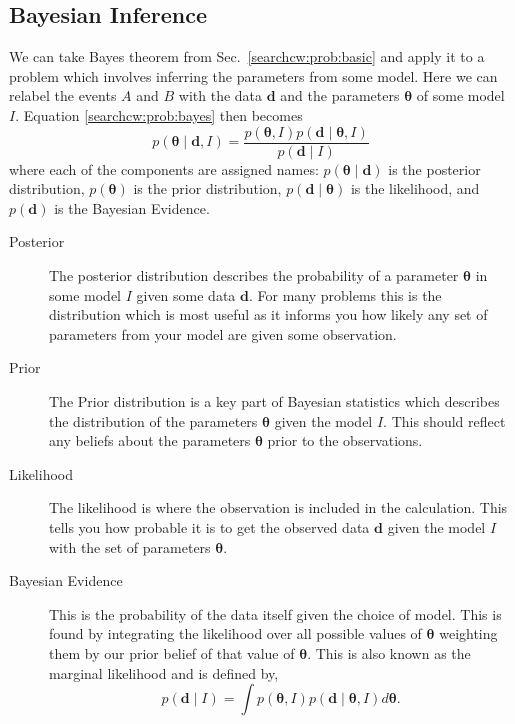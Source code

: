 \subsection{\label{searchcw:bayes}Bayesian Inference}

We can take Bayes theorem from Sec.~\ref{searchcw:prob:basic} and apply it to a
problem which involves inferring the parameters from some model. Here we can
relabel the events $A$ and $B$ with the data ${\bm d}$ and the parameters ${\bm
\theta}$ of some model $I$.  Equation \ref{searchcw:prob:bayes} then becomes
%
\begin{equation}
\label{searchcw:bayes:bayes}
p({\bm \theta} \mid {\bm d}, I) = \frac{p({\bm \theta}, I)p({\bm d} \mid {\bm \theta}, I)}{p({\bm d} \mid I)}
\end{equation}
%
where each of the components are assigned names: $p({\bm \theta} \mid {\bm d})$
is the posterior distribution, $p({\bm \theta})$ is the prior distribution,
$p({\bm d} \mid {\bm \theta})$ is the likelihood, and $p({\bm d})$ is the
Bayesian Evidence.

\begin{description}
	\item [Posterior]
        The posterior distribution describes the probability of a parameter
${\bm \theta}$ in some model $I$ given some data $\bm{d}$. For many problems this is
the distribution which is most useful as it informs you how likely any set of
parameters from your model are given some observation.
	
        \item [Prior] The Prior distribution is a key part of Bayesian
statistics which describes the distribution of the parameters ${\bm \theta}$ given the model $I$. This should reflect any beliefs about the parameters $\bm{\theta}$ prior to the observations.
	
        \item [Likelihood] The likelihood is where the observation is included
in the calculation. This tells you how probable it is to get the observed data
$\bm{d}$ given the model $I$ with the set of parameters $\bm{\theta}$. 
	
        \item [Bayesian Evidence] This is the probability of the data itself
given the choice of model. This is found by integrating the likelihood over all
possible values of ${\bm \theta}$ weighting them by our prior belief of that
value of ${\bm \theta}$. This is also known as the marginal
likelihood and is defined by,
        \begin{equation} \label{searchcw:bayes:evidence} 
            p({\bm d} \mid I) = \int p({\bm \theta}, I)p({\bm d} \mid {\bm \theta}, I) d{\bm \theta}.
        \end{equation} 
\end{description}

